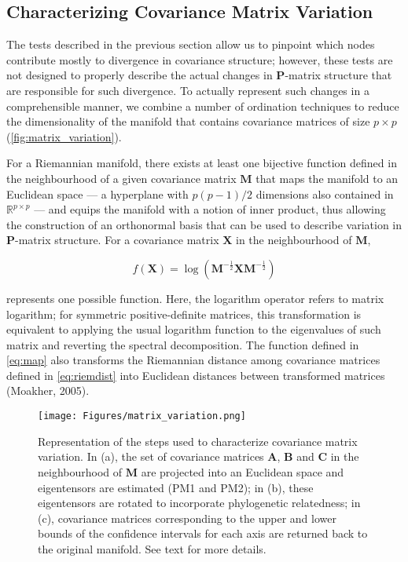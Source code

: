 \documentclass[12pt,twoside]{report}
\begin{document}
\subsection{Characterizing Covariance Matrix
Variation}\label{characterizing-covariance-matrix-variation}

The tests described in the previous section allow us to pinpoint which
nodes contribute mostly to divergence in covariance structure; however,
these tests are not designed to properly describe the actual changes in
$\mathbf{P}$-matrix structure that are responsible for such divergence.
To actually represent such changes in a comprehensible manner, we
combine a number of ordination techniques to reduce the dimensionality
of the manifold that contains covariance matrices of size $p \times p$
(\autoref{fig:matrix_variation}).

For a Riemannian manifold, there exists at least one bijective function
defined in the neighbourhood of a given covariance matrix $\mathbf{M}$
that maps the manifold to an Euclidean space --- a hyperplane with
$p (p - 1) / 2$ dimensions also contained in $\mathbb{R}^{p \times p}$
--- and equips the manifold with a notion of inner product, thus
allowing the construction of an orthonormal basis that can be used to
describe variation in $\mathbf{P}$-matrix structure. For a covariance
matrix $\mathbf{X}$ in the neighbourhood of $\mathbf{M}$,

\begin{equation}
f(\mathbf{X}) = \log (\mathbf{M}^{- \frac{1}{2}} \mathbf{X} \mathbf{M}^{- \frac{1}{2}})
\label{eq:map}
\end{equation}

represents one possible function. Here, the logarithm operator refers to
matrix logarithm; for symmetric positive-definite matrices, this
transformation is equivalent to applying the usual logarithm function to
the eigenvalues of such matrix and reverting the spectral decomposition.
The function defined in \autoref{eq:map} also transforms the Riemannian
distance among covariance matrices defined in \autoref{eq:riemdist} into
Euclidean distances between transformed matrices (Moakher, 2005).

\begin{figure}[htbp]
\centering
\texttt{[image: Figures/matrix\_variation.png]}
\caption{Representation of the steps used to characterize covariance
matrix variation. In (a), the set of covariance matrices $\mathbf{A}$,
$\mathbf{B}$ and $\mathbf{C}$ in the neighbourhood of $\mathbf{M}$ are
projected into an Euclidean space and eigentensors are estimated (PM1
and PM2); in (b), these eigentensors are rotated to incorporate
phylogenetic relatedness; in (c), covariance matrices corresponding to
the upper and lower bounds of the confidence intervals for each axis are
returned back to the original manifold. See text for more details.
\label{fig:matrix_variation}}
\end{figure}
\end{document}
